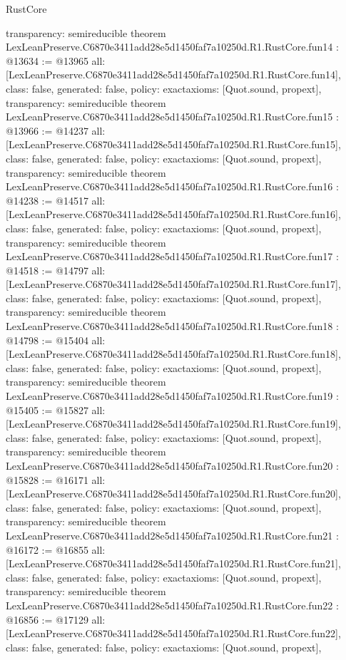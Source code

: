 \begin{lexlean}{RustCore}
\begin{coremodule}
{  transparency: semireducible
}
theorem LexLeanPreserve.C6870e3411add28e5d1450faf7a10250d.R1.RustCore.fun14 : @13634 := @13965 {
  all: [LexLeanPreserve.C6870e3411add28e5d1450faf7a10250d.R1.RustCore.fun14],
  class: false,
  generated: false,
  policy: exact{axioms: [Quot.sound, propext]},
  transparency: semireducible
}
theorem LexLeanPreserve.C6870e3411add28e5d1450faf7a10250d.R1.RustCore.fun15 : @13966 := @14237 {
  all: [LexLeanPreserve.C6870e3411add28e5d1450faf7a10250d.R1.RustCore.fun15],
  class: false,
  generated: false,
  policy: exact{axioms: [Quot.sound, propext]},
  transparency: semireducible
}
theorem LexLeanPreserve.C6870e3411add28e5d1450faf7a10250d.R1.RustCore.fun16 : @14238 := @14517 {
  all: [LexLeanPreserve.C6870e3411add28e5d1450faf7a10250d.R1.RustCore.fun16],
  class: false,
  generated: false,
  policy: exact{axioms: [Quot.sound, propext]},
  transparency: semireducible
}
theorem LexLeanPreserve.C6870e3411add28e5d1450faf7a10250d.R1.RustCore.fun17 : @14518 := @14797 {
  all: [LexLeanPreserve.C6870e3411add28e5d1450faf7a10250d.R1.RustCore.fun17],
  class: false,
  generated: false,
  policy: exact{axioms: [Quot.sound, propext]},
  transparency: semireducible
}
theorem LexLeanPreserve.C6870e3411add28e5d1450faf7a10250d.R1.RustCore.fun18 : @14798 := @15404 {
  all: [LexLeanPreserve.C6870e3411add28e5d1450faf7a10250d.R1.RustCore.fun18],
  class: false,
  generated: false,
  policy: exact{axioms: [Quot.sound, propext]},
  transparency: semireducible
}
theorem LexLeanPreserve.C6870e3411add28e5d1450faf7a10250d.R1.RustCore.fun19 : @15405 := @15827 {
  all: [LexLeanPreserve.C6870e3411add28e5d1450faf7a10250d.R1.RustCore.fun19],
  class: false,
  generated: false,
  policy: exact{axioms: [Quot.sound, propext]},
  transparency: semireducible
}
theorem LexLeanPreserve.C6870e3411add28e5d1450faf7a10250d.R1.RustCore.fun20 : @15828 := @16171 {
  all: [LexLeanPreserve.C6870e3411add28e5d1450faf7a10250d.R1.RustCore.fun20],
  class: false,
  generated: false,
  policy: exact{axioms: [Quot.sound, propext]},
  transparency: semireducible
}
theorem LexLeanPreserve.C6870e3411add28e5d1450faf7a10250d.R1.RustCore.fun21 : @16172 := @16855 {
  all: [LexLeanPreserve.C6870e3411add28e5d1450faf7a10250d.R1.RustCore.fun21],
  class: false,
  generated: false,
  policy: exact{axioms: [Quot.sound, propext]},
  transparency: semireducible
}
theorem LexLeanPreserve.C6870e3411add28e5d1450faf7a10250d.R1.RustCore.fun22 : @16856 := @17129 {
  all: [LexLeanPreserve.C6870e3411add28e5d1450faf7a10250d.R1.RustCore.fun22],
  class: false,
  generated: false,
  policy: exact{axioms: [Quot.sound, propext]},
}
\end{coremodule}
\end{lexlean}
